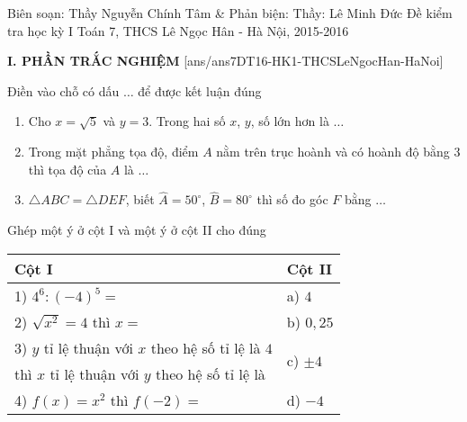 \begin{name}
		{Biên soạn: Thầy Nguyễn Chính Tâm \& Phản biện: Thầy: Lê Minh Đức}
		{Đề kiểm tra học kỳ I Toán 7, THCS Lê Ngọc Hân - Hà Nội, 2015-2016}
	\end{name}
	\noindent\textbf{I. PHẦN TRẮC NGHIỆM}
	\setcounter{ex}{0}
	[ans/ans7DT16-HK1-THCSLeNgocHan-HaNoi]
\begin{ex}%
Điền vào chỗ có dấu $\ldots$ để được kết luận đúng
\begin{enumerate}
\item Cho $x=\sqrt{5}$ và $y=3$. Trong hai số $x$, $y$, số lớn hơn là $\ldots$
\item Trong mặt phẳng tọa độ, điểm $A$ nằm trên trục hoành và có hoành độ bằng $3$ thì tọa độ của $A$ là $\ldots$
\item $\triangle ABC=\triangle DEF$, biết $\widehat{A}=50^\circ$, $\widehat{B}=80^\circ$ thì số đo góc $F$ bằng $\ldots$
\end{enumerate}
\end{ex}
	
\begin{ex}%
Ghép một ý ở cột I và một ý ở cột II cho đúng
\begin{center}
{\renewcommand{\arraystretch}{1.25}
\begin{tabular}{| l | l |}
 \hline
\hspace*{3cm}
\textbf{Cột I}
&\hspace*{1cm}\textbf{Cột II}\hspace*{1cm}\\
 \hline
1) $4^6:\left(-4\right)^5=$&a) $4$\\
\hline
2) $\sqrt{x^2}=4$ thì $x=$&b) $0,25$\\
\hline
3) $y$ tỉ lệ thuận với $x$ theo hệ số tỉ lệ là $4$&\multirow{2}{1cm}{c) $\pm 4$}\\ thì $x$ tỉ lệ thuận với $y$ theo hệ số tỉ lệ là&\\
\hline
4) $f(x)=x^2$ thì $f(-2)=$&d) $-4$\\
\hline
\end{tabular}}
\end{center}
\end{ex}

